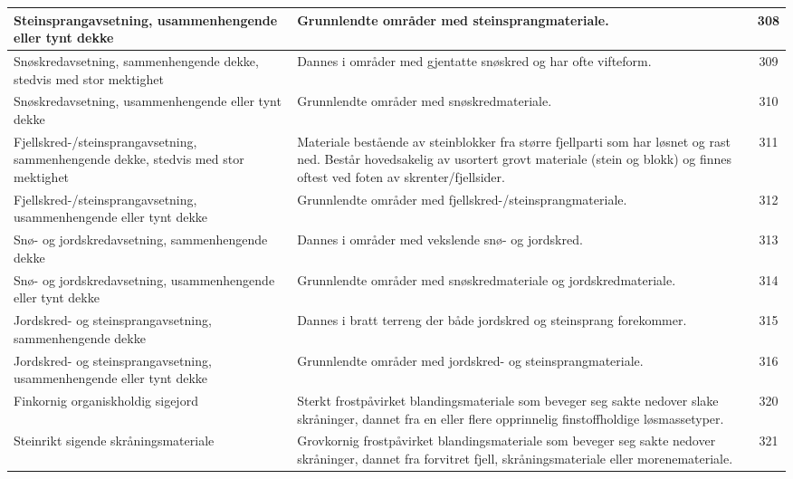 \begin{longtable}{|p{3.5cm}|p{6.2cm}|c|}
    Steinsprangavsetning, usammenhengende eller tynt dekke & Grunnlendte områder med steinsprangmateriale. & 308 \\ \hline
    Snøskredavsetning, sammenhengende dekke, stedvis med stor mektighet & Dannes i områder med gjentatte snøskred og har ofte vifteform. & 309 \\ \hline
    Snøskredavsetning, usammenhengende eller tynt dekke & Grunnlendte områder med snøskredmateriale. & 310 \\ \hline
    Fjellskred-/steinsprangavsetning, sammenhengende dekke, stedvis med stor mektighet & Materiale bestående av steinblokker fra større fjellparti som har løsnet og rast ned. Består hovedsakelig av usortert grovt materiale (stein og blokk) og finnes oftest ved foten av skrenter/fjellsider. & 311 \\ \hline
    Fjellskred-/steinsprangavsetning, usammenhengende eller tynt dekke & Grunnlendte områder med fjellskred-/steinsprangmateriale. & 312 \\ \hline
    Snø- og jordskredavsetning, sammenhengende dekke & Dannes i områder med vekslende snø- og jordskred. & 313 \\ \hline
    Snø- og jordskredavsetning, usammenhengende eller tynt dekke & Grunnlendte områder med snøskredmateriale og jordskredmateriale. & 314 \\ \hline
    Jordskred- og steinsprangavsetning, sammenhengende dekke & Dannes i bratt terreng der både jordskred og steinsprang forekommer. & 315 \\ \hline
    Jordskred- og steinsprangavsetning, usammenhengende eller tynt dekke & Grunnlendte områder med jordskred- og steinsprangmateriale. & 316 \\ \hline
    Finkornig organiskholdig sigejord & Sterkt frostpåvirket blandingsmateriale som beveger seg sakte nedover slake skråninger, dannet fra en eller flere opprinnelig finstoffholdige løsmassetyper. & 320 \\ \hline
    Steinrikt sigende skråningsmateriale & Grovkornig frostpåvirket blandingsmateriale som beveger seg sakte nedover skråninger, dannet fra forvitret fjell, skråningsmateriale eller morenemateriale. & 321 \\ \hline
\end{longtable}